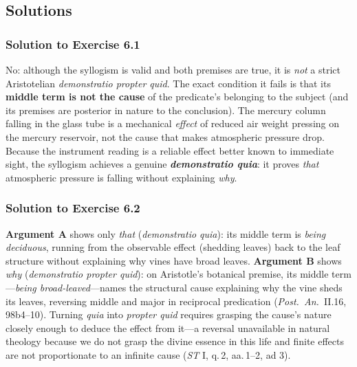\subsection{Solutions}

\subsubsection*{Solution to Exercise 6.1}
No: although the syllogism is valid and both premises are true, it is \emph{not} a strict Aristotelian \emph{demonstratio propter quid}. The exact condition it fails is that its \textbf{middle term is not the cause} of the predicate's belonging to the subject (and its premises are posterior in nature to the conclusion). The mercury column falling in the glass tube is a mechanical \emph{effect} of reduced air weight pressing on the mercury reservoir, not the cause that makes atmospheric pressure drop. Because the instrument reading is a reliable effect better known to immediate sight, the syllogism achieves a genuine \textbf{\emph{demonstratio quia}}: it proves \emph{that} atmospheric pressure is falling without explaining \emph{why}.

\subsubsection*{Solution to Exercise 6.2}
\textbf{Argument A} shows only \emph{that} (\emph{demonstratio quia}): its middle term is \emph{being deciduous}, running from the observable effect (shedding leaves) back to the leaf structure without explaining why vines have broad leaves. \textbf{Argument B} shows \emph{why} (\emph{demonstratio propter quid}): on Aristotle's botanical premise, its middle term---\emph{being broad-leaved}---names the structural cause explaining why the vine sheds its leaves, reversing middle and major in reciprocal predication (\emph{Post.\ An.}\ II.16, 98b4--10). Turning \emph{quia} into \emph{propter quid} requires grasping the cause's nature closely enough to deduce the effect from it---a reversal unavailable in natural theology because we do not grasp the divine essence in this life and finite effects are not proportionate to an infinite cause (\emph{ST} I, q.\,2, aa.\,1--2, ad 3).

